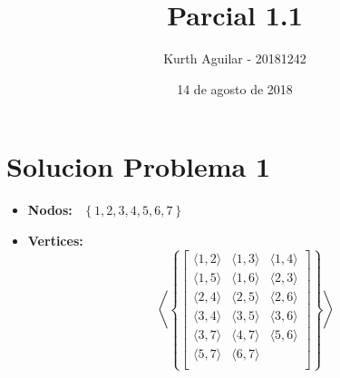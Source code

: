 \documentclass[10pt,a4paper]{article}
\begin{document}
\title{Parcial 1.1}
\author{Kurth Aguilar - 20181242 }
\date{14 de agosto de 2018}
\maketitle
\section*{Solucion Problema 1}
\begin{itemize}
\item \textbf{Nodos: } \ $ \left\lbrace 1,2,3,4,5,6,7\right\rbrace $
\item \textbf{Vertices: }  
 $$
    \left\langle \left\{
        \begin{bmatrix}
            \langle 1,2 \rangle & \langle 1,3 \rangle & \langle 1,4 \rangle \\
            \langle 1,5 \rangle & \langle 1,6 \rangle & \langle 2,3 \rangle \\
            \langle 2,4 \rangle & \langle 2,5 \rangle & \langle 2,6 \rangle \\
            \langle 3,4 \rangle & \langle 3,5 \rangle & \langle 3,6 \rangle \\
            \langle 3,7 \rangle & \langle 4,7 \rangle & \langle 5,6 \rangle \\
            \langle 5,7 \rangle & \langle 6,7 \rangle &   \\
        \end{bmatrix}
    \right\} \right\rangle
$$
\end{itemize}
\end{document}
